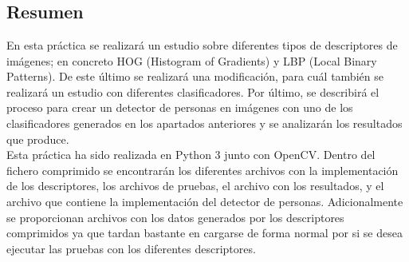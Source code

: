 \chapter*{}
\section{Resumen}
En esta práctica se realizará un estudio sobre diferentes tipos de descriptores de imágenes; en concreto HOG (Histogram of Gradients) y LBP (Local Binary Patterns). De este último se realizará una modificación, para cuál también se realizará un estudio con diferentes clasificadores. Por último, se describirá el proceso para crear un detector de personas en imágenes con uno de los clasificadores generados en los apartados anteriores y se analizarán los resultados que produce. \\

Esta práctica ha sido realizada en Python 3 junto con OpenCV. Dentro del fichero comprimido se encontrarán los diferentes archivos con la implementación de los descriptores, los archivos de pruebas, el archivo con los resultados, y el archivo que contiene la implementación del detector de personas. Adicionalmente se proporcionan archivos con los datos generados por los descriptores comprimidos ya que tardan bastante en cargarse de forma normal por si se desea ejecutar las pruebas con los diferentes descriptores.